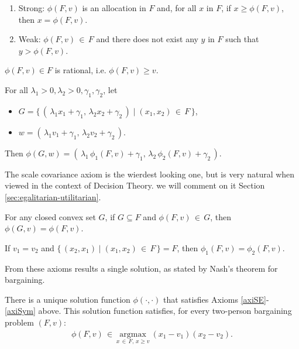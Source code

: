 \begin{axiom}[Efficiency.]
  \label{axiSE}
  $ $ %

  \begin{enumerate}
    \item Strong: $\phi(F, v)$ is an allocation in $F$ and, for all $x$ in $F$, if $x \geq \phi(F, v)$, then $x = \phi(F, v)$.
    \item Weak: $\phi(F, v) \, \in \, F$ and there does not exist any $y$ in $F$ such that $y > \phi(F, v)$.
  \end{enumerate}
\end{axiom}
\begin{axiom} $\phi(F, v) \in F$ is rational, i.e. $\phi(F, v) \geq v$.
\end{axiom}
\begin{axiom} For all $\lambda_1 > 0, \lambda_2 > 0, \gamma_1, \gamma_2$, let
	\begin{itemize}
		\item $G = \{ \, ( \, \lambda_1 x_1 + \gamma_1, \, \lambda_2 x_2 + \gamma_2 \, ) \; | \; (x_1, x_2) \, \in \, F \, \}$,
		\item $w = ( \, \lambda_1 v_1 + \gamma_1, \, \lambda_2 v_2 + \gamma_2 \, )$.
	\end{itemize}
	Then $\phi(G, w) = ( \, \lambda_1 \,  \phi_1(F, v) + \gamma_1, \,  \lambda_2 \,  \phi_2(F, v) + \gamma_2 \, )$.
	\label{scalecov}
\end{axiom}
The scale covariance axiom is the wierdest looking one, but is very natural when viewed in the context of Decision Theory. we will comment on it Section \ref{sec:egalitarian-utilitarian}.
\begin{axiom} For any closed convex set $G$, if $G \subseteq F$ and $\phi(F, v) \, \in \, G$, then $\phi(G, v) = \phi(F, v)$.
\end{axiom}
\begin{axiom}[Symmetry.] If $v_1 = v_2$ and $\{ \, (x_2, x_1) \; | \; (x_1, x_2) \, \in \, F \, \} = F$, then $\phi_1(F, v) = \phi_2(F, v)$.
\label{axiSym}
\end{axiom}


From these axioms results a single solution, as stated by Nash's theorem for bargaining.

\begin{theorem}
There is a unique solution function $\phi(\cdot, \cdot)$ that satisfies Axioms \ref{axiSE}-\ref{axiSym} above. This solution function satisfies, for every two-person bargaining problem $(F, v)$:
\begin{align} \label{thm1}
	\phi(F, v) \, \in \, \underset{x \, \in \, F, \, x \geq v}{\mathrm{argmax}} \ (x_1 - v_1)(x_2 - v_2).
\end{align}
\end{theorem}

